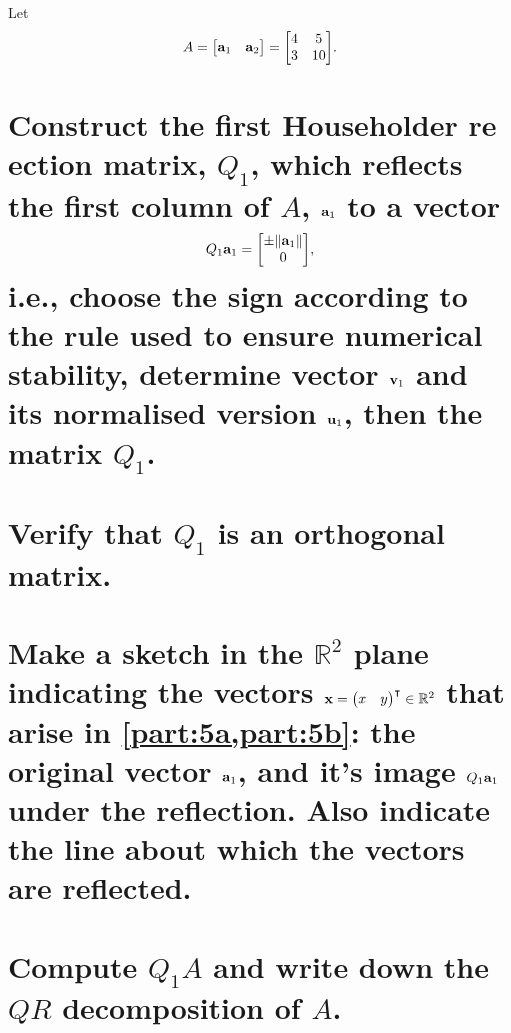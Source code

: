 \documentclass[boxes,pages]{homework}
\newcommand{\tpose}[1]{#1^\intercal}
\begin{document}
\begin{problem}
Let \[ A = \mqty[\vb{a}_1 & \vb{a}_2] = \mqty[ 4 & 5 \\ 3 & 10].\]
\begin{parts}
	\part{Construct the first Householder re ection matrix, $Q_1$, which reflects the first column of $A$, $\vb{a}_1$ to a vector \[Q_1\vb{a}_1 = \mqty[\pm\norm{\vb{a}_1} \\ 0],\] i.e., choose the sign according to the rule used to ensure numerical stability, determine vector $\vb{v}_1$ and its normalised version $\vb{u}_1$, then the matrix $Q_1$.}\label{part:5a}
	\part{Verify that $Q_1$ is an orthogonal matrix.}\label{part:5b}
	\part{Make a sketch in the $\mathbb{R}^2$ plane indicating the vectors $\vb{x} = \tpose{\mqty(x & y)}\in\mathbb{R}^2$ that arise in \cref{part:5a,part:5b}: the original vector $\vb{a}_1$, and it's image $Q_1\vb{a}_1$ under the reflection. Also indicate
		the line about which the vectors are reflected.}\label{part:5c}
	\part{Compute $Q_1A$ and write down the $QR$ decomposition of $A$.}\label{part:5d}
\end{parts}
\end{problem}
\end{document}
